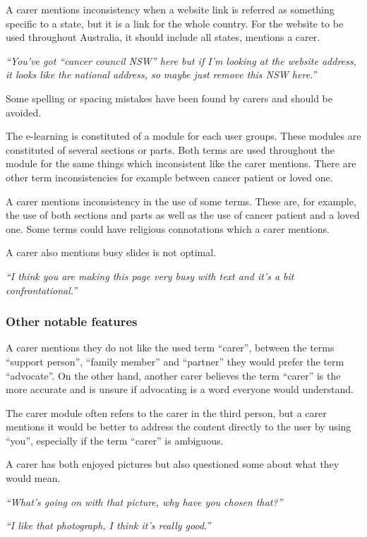 \documentclass{sigchi}
\begin{document}
A carer mentions inconsistency when a website link is referred as something specific to a state, but it is a link for the whole country. For the website to be used throughout Australia, it should include all states, mentions a carer. 

\textit{“You’ve got “cancer council NSW” here but if I’m looking at the website address, it looks like the national address, so maybe just remove this NSW here.”}

Some spelling or spacing mistakes have been found by carers and should be avoided.

The e-learning is constituted of a module for each user groups. These modules are constituted of several sections or parts. Both terms are used throughout the module for the same things which inconsistent like the carer mentions. There are other term inconsistencies for example between cancer patient or loved one.

A carer mentions inconsistency in the use of some terms. These are, for example, the use of both sections and parts as well as the use of cancer patient and a loved one. Some terms could have religious connotations which a carer mentions.

A carer also mentions busy slides is not optimal.

\textit{“I think you are making this page very busy with text and it’s a bit confrontational.”}

\subsubsection{Other notable features}
A carer mentions they do not like the used term “carer”, between the terms “support person”, “family member” and “partner” they would prefer the term “advocate”. On the other hand, another carer believes the term “carer” is the more accurate and is unsure if advocating is a word everyone would understand.

The carer module often refers to the carer in the third person, but a carer mentions it would be better to address the content directly to the user by using “you”, especially if the term “carer” is ambiguous. 

A carer has both enjoyed pictures but also questioned some about what they would mean.

\textit{“What’s going on with that picture, why have you chosen that?”}

\textit{“I like that photograph, I think it’s really good.”}
\end{document}
